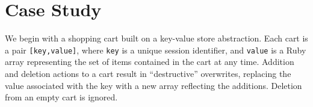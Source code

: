 \section{Case Study}
\label{sec:case}

We begin with a shopping
cart built on a key-value store abstraction.  Each cart is a pair \texttt{[key,value]}, where \texttt{key} is a unique 
session identifier, and \texttt{value} is a Ruby array
representing the set of items contained in the cart at any time.  Addition
and deletion actions to a cart result in ``destructive'' overwrites,
replacing the value associated with the key with a new array reflecting
the additions.  Deletion from an empty cart is ignored. 


